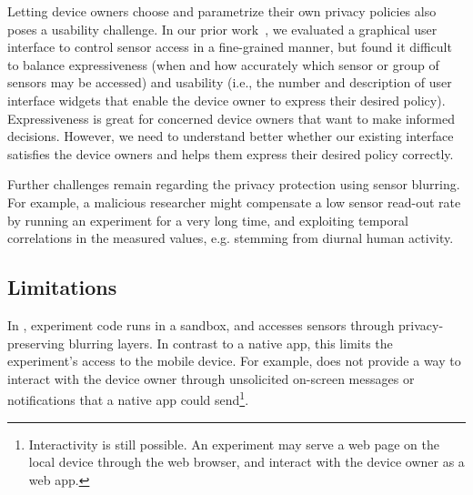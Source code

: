 Letting device owners choose and parametrize their own privacy 
policies also poses a usability challenge.
In our prior work~\cite{sensorium, rafetseder2013sensorium}, 
we evaluated a graphical user interface to control sensor access in 
a fine-grained manner, but found it difficult to 
balance expressiveness (when and how accurately which 
sensor or group of sensors may be accessed) and usability (i.e., 
the number and description of user interface widgets that enable 
the device owner to express their desired policy).
Expressiveness is great for concerned device owners 
that want to make informed decisions. 
However, we need to understand better whether our existing interface 
satisfies the device owners and helps them express their desired 
policy correctly.



Further challenges remain regarding the privacy protection
using sensor blurring. For example, 
a malicious researcher might compensate 
a low sensor read-out rate by running an experiment for a 
very long time, and exploiting temporal correlations in the measured 
values, e.g. stemming from diurnal human activity.


\subsection{Limitations}\label{subsec-limitations}
In \sysname, experiment code runs in a sandbox, and 
accesses sensors through privacy-preserving blurring layers. 
In contrast to a native app, this limits
the experiment's access to the mobile device. For example, \sysname 
does not provide a way to interact with the device owner 
through unsolicited on-screen messages or notifications that a native 
app could send\footnote{\scriptsize Interactivity is still possible. 
An experiment may serve a web 
page on the local device through the web browser, and interact with 
the device owner as a web app.}. 

